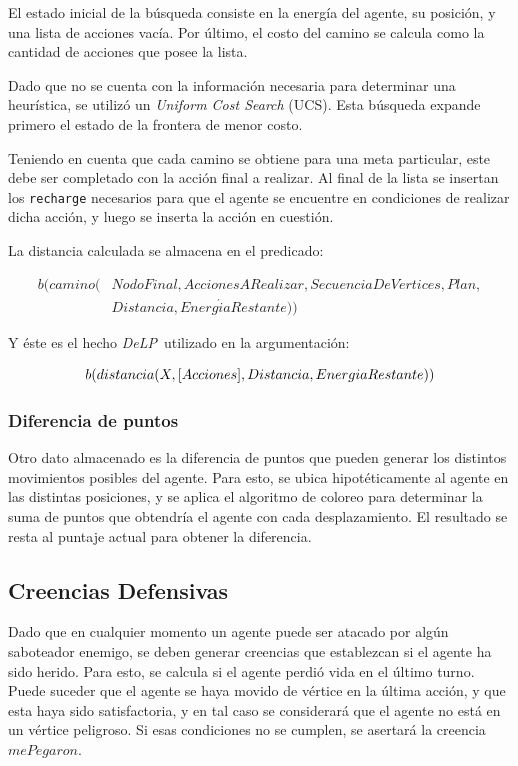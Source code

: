 \documentclass[oneside]{book}
\theoremstyle{definition}
\newcommand{\DLP}{\mbox{\textit{DeLP}}}
\newcommand{\lit}[1]{\mbox{$ #1$}}
\newcommand{\nlA}[1]{$$\mbox{#1}$$}
\begin{document}
El estado inicial de la búsqueda consiste en la energía del agente, su posición, y una 
lista de acciones vacía. Por último, el costo del camino se calcula como la cantidad de 
acciones que posee la lista.

Dado que no se cuenta con la información necesaria para determinar una heurística, se 
utilizó un \textit{Uniform Cost Search} (UCS). Esta búsqueda expande primero el estado
de la frontera de menor costo.

Teniendo en cuenta que cada camino se obtiene para una meta particular, este debe ser
completado con la acción final a realizar. Al final de la lista se insertan los 
\texttt{recharge} necesarios para que el agente se encuentre en condiciones de realizar 
dicha acción, y luego se inserta la acción en cuestión.

La distancia calculada se almacena en el predicado:

\begin{equation*}
\begin{aligned}
b(camino(&NodoFinal, AccionesARealizar, SecuenciaDeV\acute{e}rtices, Plan,\\
   &Distancia, Energ\acute{i}aRestante))
\end{aligned}
\end{equation*}

Y éste es el hecho \DLP\ utilizado en la argumentación:

\nlA{\lit{b(distancia(X, [Acciones], Distancia, EnergiaRestante))}}

\subsubsection{Diferencia de puntos}

Otro dato almacenado es la diferencia de puntos que pueden generar los distintos
movimientos posibles del agente. Para esto, se ubica hipotéticamente al agente
en las distintas posiciones, y se aplica el algoritmo de coloreo para determinar
la suma de puntos que obtendría el agente con cada desplazamiento. El resultado
se resta al puntaje actual para obtener la diferencia.

\subsection{Creencias Defensivas}

Dado que en cualquier momento un agente puede ser atacado por algún saboteador 
enemigo, se deben generar creencias que establezcan si el agente ha sido herido.
Para esto, se calcula si el agente perdió vida en el último turno. Puede suceder
que el agente se haya movido de vértice en la última acción, y que esta haya sido
satisfactoria, y en tal caso se considerará que el agente no está en un vértice
peligroso. Si esas condiciones no se cumplen, se asertará la creencia 
\lit{mePegaron}.
\end{document}
